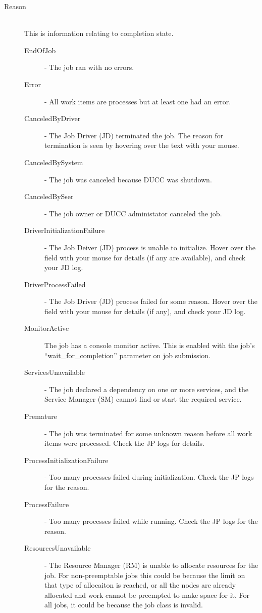 \begin{description}
            \item[Reason] \hfill \\
              This is information relating to completion state.          
              \begin{description}
                  \item[EndOfJob] - The job ran with no errors. 
                  \item[Error] - All work items are processes but at least one had an error. 
                  \item[CanceledByDriver] - The Job Driver (JD) terminated the job. The reason for termination is 
                    seen by hovering over the text with your mouse. 
                  \item[CanceledBySystem] - The job was canceled because DUCC was shutdown. 
                  \item[CanceledBySser] - The job owner or DUCC administator canceled the job. 
                  \item[DriverInitializationFailure] - The Job Deiver (JD) process is unable to initialize. Hover over 
                    the field with your mouse for details (if any are available), and check your JD log. 
                  \item[DriverProcessFailed] - The Job Driver (JD) process failed for some reason. Hover over the 
                    field with your mouse for details (if any), and check your JD log. 
                  \item[MonitorActive] The job has a console monitor active.  This is enabled with the
                    job's ``wait\_for\_completion'' parameter on job submission.
                  \item[ServicesUnavailable] - The job declared a dependency on one or more services, and the 
                    Service Manager (SM) cannot find or start the required service. 
                  \item[Premature] - The job was terminated for some unknown reason before all work items were 
                    processed. Check the JP logs for details. 
                  \item[ProcessInitializationFailure] - Too many processes failed during initialization. Check the JP 
                    logs for the reason. 
                  \item[ProcessFailure] - Too many processes failed while running. Check the JP logs for the reason. 
                  \item[ResourcesUnavailable] - The Resource Manager (RM) is unable to allocate resources for 
                    the job. For non-preemptable jobs this could be because the limit on that type of allocaiton is 
                    reached, or all the nodes are already allocated and work cannot be preempted to make space for 
                    it. For all jobs, it could be because the job class is invalid. 
              \end{description}


\end{description}
